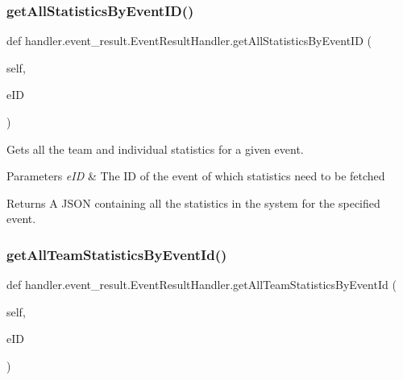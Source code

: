 \subsubsection{\texorpdfstring{get\+All\+Statistics\+By\+Event\+I\+D()}{getAllStatisticsByEventID()}}
{\footnotesize\ttfamily def handler.\+event\+\_\+result.\+Event\+Result\+Handler.\+get\+All\+Statistics\+By\+Event\+ID (\begin{DoxyParamCaption}\item[{}]{self,  }\item[{}]{e\+ID }\end{DoxyParamCaption})}



Gets all the team and individual statistics for a given event. 


\begin{DoxyParams}{Parameters}
{\em e\+ID} & The ID of the event of which statistics need to be fetched\\
\hline
\end{DoxyParams}
\begin{DoxyReturn}{Returns}
A J\+S\+ON containing all the statistics in the system for the specified event. 
\end{DoxyReturn}
\mbox{\label{classhandler_1_1event__result_1_1_event_result_handler_ab895fc012b431f69f4e43f117cc5d516}} 
\subsubsection{\texorpdfstring{get\+All\+Team\+Statistics\+By\+Event\+Id()}{getAllTeamStatisticsByEventId()}}
{\footnotesize\ttfamily def handler.\+event\+\_\+result.\+Event\+Result\+Handler.\+get\+All\+Team\+Statistics\+By\+Event\+Id (\begin{DoxyParamCaption}\item[{}]{self,  }\item[{}]{e\+ID }\end{DoxyParamCaption})}




